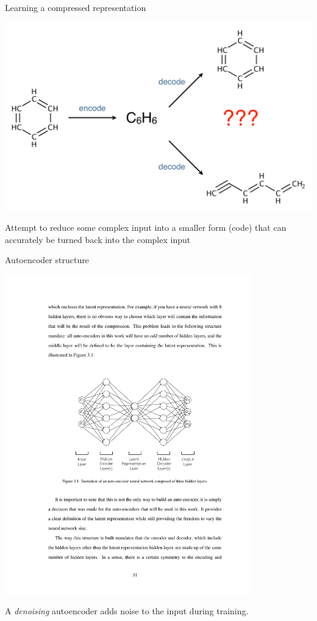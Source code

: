 \documentclass[compress]{beamer}
\begin{document}
\begin{frame}{Learning a compressed representation}
  \begin{center}
    \includegraphics[width=1.00\textwidth]{./figures/autoencoder_example.pdf}
  \end{center}
  Attempt to reduce some complex input into a smaller form (code) that can accurately be turned back into the complex input
\end{frame}

\begin{frame}{Autoencoder structure}
  \begin{center}
    \includegraphics[width=0.80\textwidth]{./figures/autoencoder.pdf}
  \end{center}
  A \textit{denoising} autoencoder adds noise to the input during training.
\end{frame}
\end{document}

